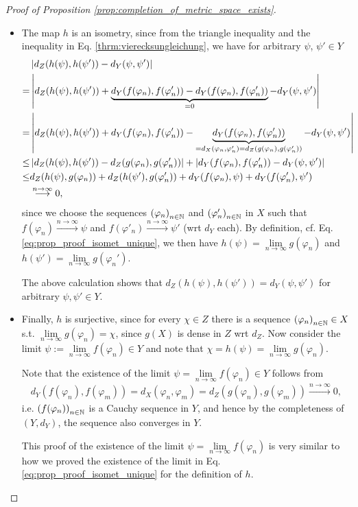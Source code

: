 \begin{proof}[Proof of Proposition \ref{prop:completion_of_metric_space_exists}]
\begin{itemize}
		\item The map $h$ is an isometry, since from the triangle inequality and the inequality in Eq. \eqref{thrm:vierecksungleichung}, we have for arbitrary $\psi$, $\psi'\in Y$
		\begin{align*}
			&\abs{d_Z(h(\psi), h(\psi')) - d_Y(\psi, \psi')} 
			\\ = &\abs{d_Z(h(\psi), h(\psi')) + \underbrace{d_Y(f(\varphi_n), f(\varphi'_n)) - d_Y(f(\varphi_n), f(\varphi'_n))}_{=0} - d_Y(\psi, \psi')}
			\\ = &\abs{d_Z(h(\psi), h(\psi')) + d_Y(f(\varphi_n), f(\varphi'_n)) - \underbrace{d_Y(f(\varphi_n), f(\varphi'_n))}_{=d_X(\varphi_n, \varphi'_n) = d_Z(g(\varphi_n), g(\varphi'_n))} - d_Y(\psi, \psi')}
			\\ \leq &\abs{d_Z(h(\psi), h(\psi')) - d_Z(g(\varphi_n), g(\varphi'_n))} + \abs{d_Y(f(\varphi_n), f(\varphi'_n)) - d_Y(\psi, \psi')}
			\\ \leq &d_Z(h(\psi), g(\varphi_n)) + d_Z(h(\psi'), g(\varphi_n')) + d_Y(f(\varphi_n), \psi) + d_Y(f(\varphi_n'), \psi')
			\\ &\overset{n\to\infty}{\longrightarrow} 0, 
		\end{align*}
		since we choose the sequences $\seq[\varphi_n]$ and $\seq[\varphi_n']$ in $X$ such that $f(\varphi_n) \overset{n\to\infty}{\longrightarrow}\psi$ and $f(\varphi'_n) \overset{n\to\infty}{\longrightarrow}\psi'$ (wrt $d_Y$ each). By definition, cf. Eq. \eqref{eq:prop_proof_isomet_unique}, we then have $h(\psi) = \lim\limits_{n\to\infty}g(\varphi_n)$ and $h(\psi') = \lim\limits_{n\to\infty}g(\varphi_n')$.
		
		The above calculation shows that $d_Z(h(\psi), h(\psi')) = d_Y(\psi, \psi')$ for arbitrary $\psi, \psi'\in Y$.
		
		\item Finally, $h$ is surjective, since for every $\chi\in Z$ there is a sequence $\seq[\varphi_n]\in X$ s.t. $\lim\limits_{n\to\infty}g(\varphi_n) = \chi$, since $g(X)$ is dense in $Z$ wrt $d_Z$. Now consider the limit $\psi := \lim\limits_{n\to\infty} f(\varphi_n)\in Y$ and note that $\chi = h(\psi) = \lim\limits_{n\to\infty}g(\varphi_n)$.
		
		Note that the existence of the limit $\psi = \lim\limits_{n\to\infty} f(\varphi_n)\in Y$ follows from
		\begin{align}
			d_Y(f(\varphi_n), f(\varphi_m)) = d_X(\varphi_n, \varphi_m) = d_Z(g(\varphi_n), g(\varphi_m)) \overset{n\to\infty}{\longrightarrow} 0, 
		\end{align}
		i.e. $\seq[f(\varphi_n)]$ is a Cauchy sequence in $Y$, and hence by the completeness of $(Y, d_Y)$, the sequence also converges in $Y$.
		
		This proof of the existence of the limit $\psi = \lim\limits_{n\to\infty} f(\varphi_n)$ is very similar to how we proved the existence of the limit in Eq. \eqref{eq:prop_proof_isomet_unique} for the definition of $h$.
	\end{itemize}
\end{proof}

